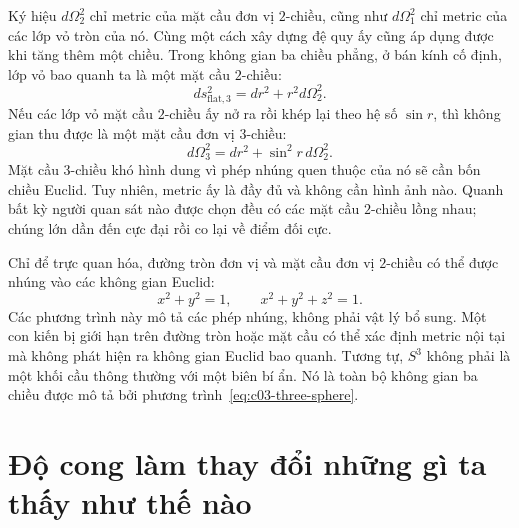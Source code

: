 Ký hiệu \(d\Omega_2^2\) chỉ metric của mặt cầu đơn vị \(2\)-chiều, cũng như \(d\Omega_1^2\) chỉ metric của các lớp vỏ tròn của nó. Cùng một cách xây dựng đệ quy ấy cũng áp dụng được khi tăng thêm một chiều. Trong không gian ba chiều phẳng, ở bán kính cố định, lớp vỏ bao quanh ta là một mặt cầu \(2\)-chiều:
\begin{equation}
ds_{\text{flat},3}^2 = dr^2 + r^2 d\Omega_2^2.
\label{eq:c03-flat-three-polar}
\end{equation}
Nếu các lớp vỏ mặt cầu \(2\)-chiều ấy nở ra rồi khép lại theo hệ số \(\sin r\), thì không gian thu được là một mặt cầu đơn vị \(3\)-chiều:
\begin{equation}
d\Omega_3^2 = dr^2 + \sin^2 r\, d\Omega_2^2.
\label{eq:c03-three-sphere}
\end{equation}
Mặt cầu \(3\)-chiều khó hình dung vì phép nhúng quen thuộc của nó sẽ cần bốn chiều Euclid. Tuy nhiên, metric ấy là đầy đủ và không cần hình ảnh nào. Quanh bất kỳ người quan sát nào được chọn đều có các mặt cầu \(2\)-chiều lồng nhau; chúng lớn dần đến cực đại rồi co lại về điểm đối cực.

\begin{classroomqa}
\end{classroomqa}

Chỉ để trực quan hóa, đường tròn đơn vị và mặt cầu đơn vị \(2\)-chiều có thể được nhúng vào các không gian Euclid:
\begin{equation}
x^2+y^2=1,
\qquad
x^2+y^2+z^2=1.
\end{equation}
Các phương trình này mô tả các phép nhúng, không phải vật lý bổ sung. Một con kiến bị giới hạn trên đường tròn hoặc mặt cầu có thể xác định metric nội tại mà không phát hiện ra không gian Euclid bao quanh. Tương tự, \(S^3\) không phải là một khối cầu thông thường với một biên bí ẩn. Nó là toàn bộ không gian ba chiều được mô tả bởi phương trình~\eqref{eq:c03-three-sphere}.

\section{Độ cong làm thay đổi những gì ta thấy như thế nào}

